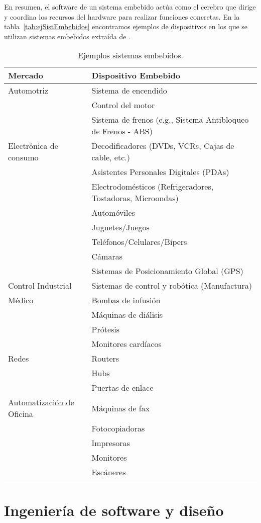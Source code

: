En resumen, el software de un sistema embebido actúa como el cerebro que dirige y coordina los recursos del hardware para realizar funciones concretas. En la tabla~\ref{tab:ejSistEmbebidos} encontramos ejemplos de dispositivos en los que se utilizan sistemas embebidos extraída de \cite{noergaard2005embedded}.

\begin{table}[h]
\caption{Ejemplos sistemas embebidos.}
    \centering
    \label{tab:ejSistEmbebidos}
    \begin{tabular}{|l|l|}
        \hline
        \textbf{Mercado} & \textbf{Dispositivo Embebido} \\ \hline
        Automotriz & Sistema de encendido \\ 
        & Control del motor \\ 
        & Sistema de frenos (e.g., Sistema Antibloqueo de Frenos - ABS) \\ \hline
        Electrónica de consumo & Decodificadores (DVDs, VCRs, Cajas de cable, etc.) \\ 
        & Asistentes Personales Digitales (PDAs) \\ 
        & Electrodomésticos (Refrigeradores, Tostadoras, Microondas) \\ 
        & Automóviles \\ 
        & Juguetes/Juegos \\ 
        & Teléfonos/Celulares/Bípers \\ 
        & Cámaras \\ 
        & Sistemas de Posicionamiento Global (GPS) \\ \hline
        Control Industrial & Sistemas de control y robótica (Manufactura) \\ \hline
        Médico & Bombas de infusión \\ 
        & Máquinas de diálisis \\ 
        & Prótesis \\ 
        & Monitores cardíacos \\ \hline
        Redes & Routers \\ 
        & Hubs \\ 
        & Puertas de enlace \\ \hline
        Automatización de Oficina & Máquinas de fax \\ 
        & Fotocopiadoras \\ 
        & Impresoras \\ 
        & Monitores \\ 
        & Escáneres \\ \hline
    \end{tabular}
    \label{tab:sistemas_embebidos}
\end{table}

\section{Ingeniería de software y diseño}
